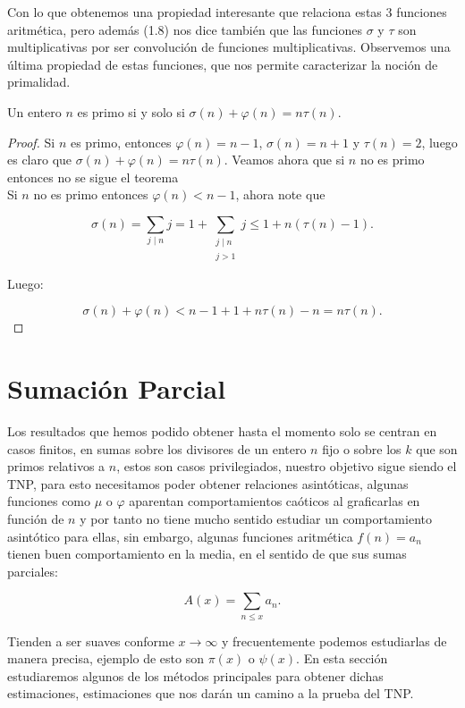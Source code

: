 Con lo que obtenemos una propiedad  interesante que relaciona estas 3 funciones aritmética, pero  además (1.8) nos dice también que las funciones $\sigma$ y $\tau$ son multiplicativas por ser convolución de funciones multiplicativas. Observemos una última propiedad de estas funciones, que nos permite caracterizar la noción de primalidad.

\begin{prop}
Un entero $n$ es primo si y solo si $\sigma(n)+\varphi(n)=n\tau(n)$.
\end{prop}

\begin{proof}

Si $n$ es primo, entonces $\varphi(n)=n-1$, $\sigma(n)=n+1$ y $\tau(n)=2$, luego es claro que $\sigma(n)+\varphi(n)=n\tau(n)$. Veamos ahora que si $n$ no es primo entonces no se sigue el teorema\\

Si $n$ no es primo entonces $\varphi(n)<n-1$, ahora note que

$$\sigma(n)=\sum_{j\mid n}j=1+\sum_{\substack{j\mid n\\ j>1}}j\leq 1+n(\tau(n)-1).$$

Luego:

$$\sigma(n)+\varphi(n)<n-1+1+n\tau(n)-n=n\tau(n).$$
\end{proof}

\section{Sumación Parcial}

Los resultados que hemos podido obtener hasta el momento solo se centran en casos finitos, en sumas sobre los divisores de un entero $n$ fijo o sobre los $k$ que son primos relativos a $n$, estos son casos privilegiados, nuestro objetivo sigue siendo el TNP, para esto necesitamos poder obtener relaciones asintóticas, algunas funciones como $\mu$ o $\varphi$ aparentan comportamientos caóticos al graficarlas en función de $n$ y por tanto no tiene mucho sentido estudiar un comportamiento asintótico para  ellas, sin embargo, algunas funciones aritmética $f(n)=a_n$ tienen buen comportamiento en la media, en el sentido de que sus sumas parciales:

$$A(x)=\sum_{n\leq x}a_n.$$

Tienden a ser suaves  conforme $x\to \infty$ y frecuentemente podemos estudiarlas de manera precisa, ejemplo de esto son $\pi(x)$ o $\psi(x)$. En esta sección estudiaremos algunos de los métodos principales para obtener dichas estimaciones, estimaciones que nos darán un camino a la prueba del TNP.\\

